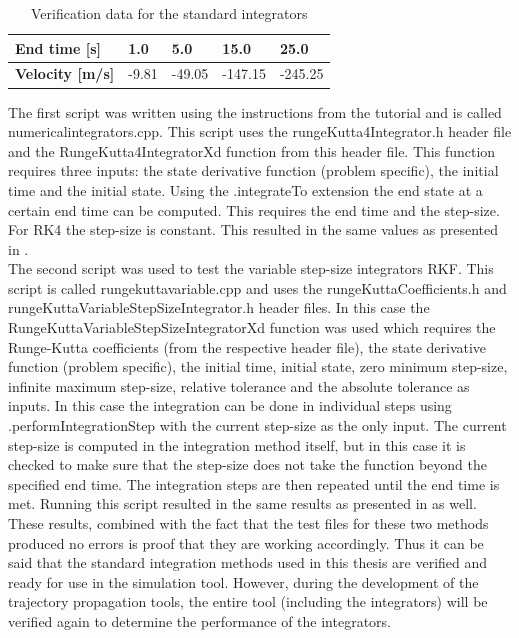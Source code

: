 \begin{table}[!ht]
\begin{center}
\caption{Verification data for the standard integrators}
\label{tab:intverdat}
\begin{tabular}{|l|l|l|l|l|}
\hline 
\textbf{End time [s]} & 1.0	& 5.0 & 15.0 & 25.0 \\ \hline 
\textbf{Velocity [m/s]} & -9.81 & -49.05 & -147.15 & -245.25 \\ \hline
\end{tabular}
\end{center}
\end{table}

The first script was written using the instructions from the tutorial and is called numericalintegrators.cpp. This script uses the rungeKutta4Integrator.h header file and the RungeKutta4IntegratorXd function from this header file. This function requires three inputs: the state derivative function (problem specific), the initial time and the initial state. Using the .integrateTo extension the end state at a certain end time can be computed. This requires the end time and the step-size. For \ac{RK4} the step-size is constant. This resulted in the same values as presented in .\\

The second script was used to test the variable step-size integrators \ac{RKF}. This script is called rungekuttavariable.cpp and uses the rungeKuttaCoefficients.h and rungeKuttaVariableStepSizeIntegrator.h header files. In this case the RungeKuttaVariableStepSizeIntegratorXd function was used which requires the Runge-Kutta coefficients (from the respective header file), the state derivative function (problem specific), the initial time, initial state, zero minimum step-size, infinite maximum step-size, relative tolerance and the absolute tolerance as inputs. In this case the integration can be done in individual steps using .performIntegrationStep with the current step-size as the only input. The current step-size is computed in the integration method itself, but in this case it is checked to make sure that the step-size does not take the function beyond the specified end time. The integration steps are then repeated until the end time is met. Running this script resulted in the same results as presented in  as well. \\

These results, combined with the fact that the test files for these two methods produced no errors is proof that they are working accordingly. Thus it can be said that the standard integration methods used in this thesis are verified and ready for use in the simulation tool. However, during the development of the trajectory propagation tools, the entire tool (including the integrators) will be verified again to determine the performance of the integrators.

